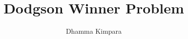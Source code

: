 \documentclass{article}
\theoremstyle{definition}
\begin{document}
\title{Dodgson Winner Problem}
 \author{Dhamma Kimpara}

\maketitle












\newpage




\newpage

\appendix


\end{document}
